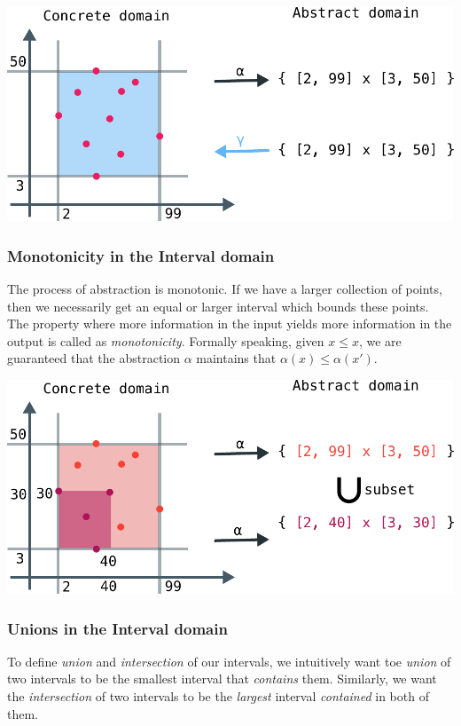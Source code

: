 \documentclass[11pt]{book}
\begin{document}
\includegraphics[width=\textwidth]{./alpha-gamma-intervals.pdf}



\subsubsection{Monotonicity in the Interval domain}

The process of abstraction is monotonic. If we have a larger collection of points, then we necessarily
get an equal or larger interval which bounds these points. The property where more information
in the input yields more information in the output is called as \emph{monotonicity}. Formally speaking,
given $x \leq x$, we are guaranteed that the abstraction $\alpha$ maintains that $\alpha(x) \leq \alpha(x')$.

\includegraphics[width=\textwidth]{./monotone.pdf}

\subsubsection{Unions in the Interval domain}

To define \emph{union} and \emph{intersection} of our intervals, we intuitively
want toe \emph{union} of two intervals to be the smallest interval that \emph{contains} them.
Similarly, we want the \emph{intersection} of two intervals to be the \emph{largest} interval
\emph{contained} in both of them.
\end{document}
